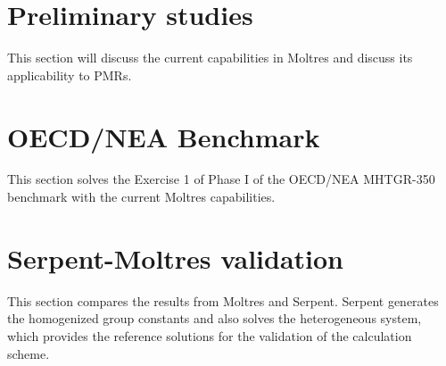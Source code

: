 \section{Preliminary studies}

This section will discuss the current capabilities in Moltres and discuss its applicability to PMRs.

\section{OECD/NEA Benchmark}

This section solves the Exercise 1 of Phase I of the OECD/NEA MHTGR-350 benchmark with the current Moltres capabilities.

\section{Serpent-Moltres validation}

This section compares the results from Moltres and Serpent.
Serpent generates the homogenized group constants and also solves the heterogeneous system, which provides the reference solutions for the validation of the calculation scheme.
